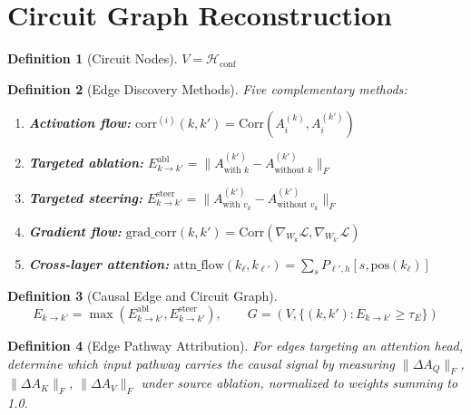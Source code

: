 \documentclass[11pt]{article}
\newtheorem{definition}{Definition}[section]
\begin{document}
\section{Circuit Graph Reconstruction}
\label{sec:graph}

\begin{definition}[Circuit Nodes]
$V = \mathcal{H}_{\text{conf}}$
\end{definition}

\begin{definition}[Edge Discovery Methods]
Five complementary methods:
\begin{enumerate}[nosep]
\item \textbf{Activation flow:} $\text{corr}^{(i)}(k, k') = \text{Corr}(A^{(k)}_i, A^{(k')}_i)$
\item \textbf{Targeted ablation:} $E^{\text{abl}}_{k \to k'} = \|A^{(k')}_{\text{with } k} - A^{(k')}_{\text{without } k}\|_F$
\item \textbf{Targeted steering:} $E^{\text{steer}}_{k \to k'} = \|A^{(k')}_{\text{with } v_k} - A^{(k')}_{\text{without } v_k}\|_F$
\item \textbf{Gradient flow:} $\text{grad\_corr}(k, k') = \text{Corr}(\nabla_{W_k} \mathcal{L}, \nabla_{W_{k'}} \mathcal{L})$
\item \textbf{Cross-layer attention:} $\text{attn\_flow}(k_\ell, k_{\ell'}) = \sum_s P_{\ell',h}[s, \text{pos}(k_\ell)]$
\end{enumerate}
\end{definition}

\begin{definition}[Causal Edge and Circuit Graph]
\begin{equation}
E_{k \to k'} = \max\left(E^{\text{abl}}_{k \to k'}, E^{\text{steer}}_{k \to k'}\right), \qquad G = \left(V, \{(k, k') : E_{k \to k'} \geq \tau_E\}\right)
\end{equation}
\end{definition}

\begin{definition}[Edge Pathway Attribution]
For edges targeting an attention head, determine which input pathway carries the causal signal by measuring $\|\Delta A_Q\|_F$, $\|\Delta A_K\|_F$, $\|\Delta A_V\|_F$ under source ablation, normalized to weights summing to 1.0.
\end{definition}
\end{document}
